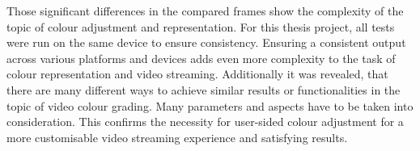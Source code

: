 \documentclass[../MasterThesis.tex]{subfiles}
\begin{document}
Those significant differences in the compared frames show the complexity of the topic of colour adjustment and representation. 
For this thesis project, all tests were run on the same device to ensure consistency. 
Ensuring a consistent output across various platforms and devices adds even more complexity to the task of colour representation and video streaming.
%
Additionally it was revealed, that there are many different ways to achieve similar results or functionalities in the topic of video colour grading. Many parameters and aspects have to be taken into consideration. This confirms the necessity for user-sided colour adjustment for a more customisable video streaming experience and satisfying results. 
	
	
	
\end{document}
